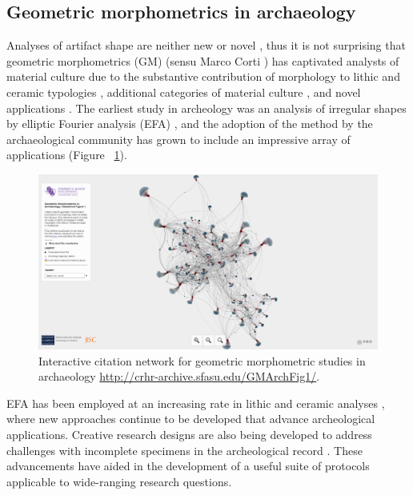 \documentclass[article]{sa}
\begin{document}
\subsection*{Geometric morphometrics in archaeology}

Analyses of artifact shape are neither new or novel \citep{RN11779}, thus it is not surprising that geometric morphometrics (GM) (sensu Marco Corti \citep{RN11559}) has captivated analysts of material culture due to the substantive contribution of morphology to lithic \citep{RN11529,RN369,RN11534} and ceramic typologies \citep{RN1752,RN11631,RN305}, additional categories of material culture \citep{RN1737,RN4374,RN11527}, and novel applications \citep{RN11543,RN11544}. The earliest study in archeology was an analysis of irregular shapes by elliptic Fourier analysis (EFA) \citep{RN4379}, and the adoption of the method by the archaeological community has grown to include an impressive array of applications (Figure ~\ref{fig:network}).

\begin{figure}[ht]\centering
\includegraphics[width=\linewidth]{Figure_02}
\caption{Interactive citation network for geometric morphometric studies in archaeology \href{http://crhr-archive.sfasu.edu/GMArchFig1/}{http://crhr-archive.sfasu.edu/GMArchFig1/}.}
\label{fig:network}
\end{figure}

EFA has been employed at an increasing rate in lithic and ceramic analyses \citep{RN4394,RN4327,RN11529,RN4350,RN4373,RN4338,RN4353,RN11627,RN305}, where new approaches continue to be developed that advance archeological applications. Creative research designs are also being developed to address challenges with incomplete specimens in the archeological record \citep{RN11575,RN11574,RN11539,RN11533,RN11730}. These advancements have aided in the development of a useful suite of protocols applicable to wide-ranging research questions.
\end{document}
